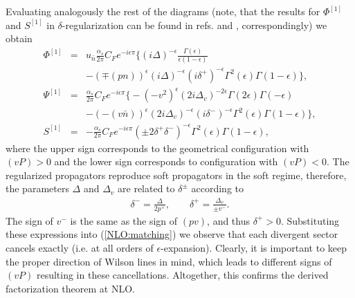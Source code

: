 \documentclass[a4paper, amsfonts, amssymb, amsmath, reprint, showkeys, nofootinbib, twoside]{revtex4-1}
\newcommand{\nn}{\nonumber}
\renewcommand{\(}{\left(}
\renewcommand{\)}{\right)}
\renewcommand{\[}{\left[}
\renewcommand{\]}{\right]}
\begin{document}
Evaluating analogously the rest of the diagrams (note, that the results for $\Phi^{[1]}$ and $S^{[1]}$ in  $\delta$-regularization can be found in refs.\cite{GarciaEchevarria:2011rb,Echevarria:2016scs} and \cite{GarciaEchevarria:2011rb,Echevarria:2015byo}, correspondingly) we obtain
\begin{eqnarray}\nn
\Phi^{[1]}&=&u_{\bar n}\frac{\alpha_s}{2\pi}C_F e^{-i\epsilon \pi}\Big\{(i\Delta)^{-\epsilon}\frac{\Gamma(\epsilon)}{\epsilon(1-\epsilon)}
\\ &&
-(\mp (pn))^\epsilon (i\Delta)^{-\epsilon}(i\delta^+)^{-\epsilon}\Gamma^2(\epsilon)\Gamma(1-\epsilon)\Big\},
\\\nn
\Psi^{[1]}&=&\frac{\alpha_s}{2\pi}C_F e^{-i\epsilon \pi}\Big\{-(-v^2)^\epsilon(2i\Delta_v)^{-2\epsilon}\Gamma(2\epsilon)\Gamma(-\epsilon)
\\ &&\label{nlo:Psi}
-(-(v\bar n))^\epsilon (2i\Delta_v)^{-\epsilon}(i\delta^-)^{-\epsilon}\Gamma^2(\epsilon)\Gamma(1-\epsilon)\Big\},
\\\label{nlo:S}
S^{[1]}&=&-\frac{\alpha_s}{2\pi}C_F e^{-i\epsilon \pi}(\pm 2\delta^+\delta^-)^{-\epsilon} \Gamma^2(\epsilon)\Gamma(1-\epsilon),
\end{eqnarray}
where the upper sign corresponds to the geometrical configuration with $(vP)>0$ and the lower sign corresponds to configuration with $(vP)<0$. The regularized propagators reproduce soft propagators in the soft regime, therefore, the parameters $\Delta$ and $\Delta_v$ are related to $\delta^\pm$ according to 
\begin{eqnarray}
\delta^-=\frac{\Delta}{2p^+},\qquad \delta^+=\frac{\Delta_v}{\pm v^-}.
\end{eqnarray}
The sign of $v^-$ is the same as the sign of $(pv)$, and thus $\delta^+>0$. Substituting these expressions into (\ref{NLO:matching}) we observe that each divergent sector cancels exactly (i.e. at all orders of $\epsilon$-expansion). Clearly, it is important to keep the proper direction of Wilson lines in mind, which leads to different signs of $(vP)$ resulting in these cancellations. Altogether, this confirms the derived factorization theorem at NLO. 
\end{document}
